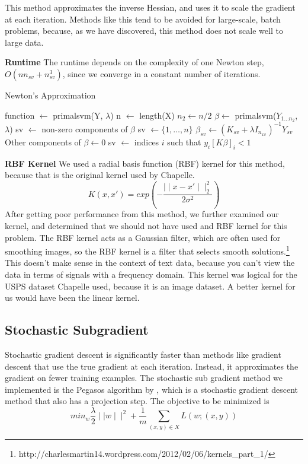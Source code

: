 \documentclass[letterpaper, 11pt]{article}
\begin{document}
This method approximates the inverse Hessian, and uses it to scale the gradient at each iteration.  Methods like this tend to be avoided for large-scale, batch problems, because, as we have discovered, this method does not scale well to large data.

\textbf{Runtime}  The runtime depends on the complexity of one Newton step, $O(nn_{sv} + n^3_{sv})$, since we converge in a constant number of iterations.  

\begin{algorithm}
\caption{Newton's Approximation}
\begin{algorithmic}
\STATE function $\leftarrow$ primalsvm(Y, $\lambda$)
\STATE n $\leftarrow$ length(X)
\STATE $n_2 \leftarrow n/2$
\STATE $\beta \leftarrow$ primalsvm($Y_{1\ldots n_2}$, $\lambda$)
\STATE sv $\leftarrow$ non-zero components of $\beta$
\ELSE
\STATE sv $\leftarrow \{ 1, \ldots, n \}$
\ENDIF
\REPEAT
\STATE $\beta_{sv} \leftarrow (K_{sv} + \lambda I_{n_{xv}})^{-1}Y_{sv}$
\STATE Other components of $\beta \leftarrow 0$
\STATE sv $\leftarrow$ indices $i$ such that $y_i[K\beta]_i < 1$
\end{algorithmic}
\end{algorithm}
\textbf{RBF Kernel}  We used a radial basis function (RBF) kernel for this method, because that is the original kernel used by Chapelle.  $$ K(x, x') = exp(-\frac{\mid \mid x-x' \mid \mid^2_2 }{2\sigma^2}) $$After getting poor performance from this method, we further examined our kernel, and determined that we should not have used and RBF kernel for this problem. The RBF kernel acts as a Gaussian filter, which are often used for smoothing images, so the RBF kernel is a filter that selects smooth solutions.\footnote{http://charlesmartin14.wordpress.com/2012/02/06/kernels\_part\_1/ }  This doesn't make sense in the context of text data, because you can't view the data in terms of signals with a frequency domain.  This kernel was logical for the USPS dataset Chapelle used, because it is an image dataset.  A better kernel for us would have been the linear kernel.

\subsection{Stochastic Subgradient}
Stochastic gradient descent is significantly faster than methods like gradient descent that use the true gradient at each iteration.  Instead, it approximates the gradient on fewer training examples.  The stochastic sub gradient method we implemented is the Pegasos algorithm by \citeauthor{pegasos}, which is a stochastic gradient descent method that also has a projection step.  The objective to be minimized is \begin{equation} min_w \frac{\lambda}{2} \mid \mid w \mid \mid ^2 +\frac{1}{m} \sum_{(x, y) \in X} L(w; (x,y)) \end{equation}
\end{document}
